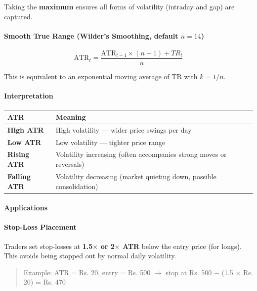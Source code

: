 \documentclass[12pt,openany]{book}
\begin{document}
Taking the \textbf{maximum} ensures all forms of volatility (intraday and gap) are captured.

\paragraph{Smooth True Range (Wilder's Smoothing, default \(n = 14\))}

\[
\text{ATR}_t = \frac{\text{ATR}_{t-1} \times (n - 1) + TR_t}{n}
\]

This is equivalent to an exponential moving average of TR with \(k = 1/n\).

\paragraph{Interpretation}

\begin{center}
\small
\renewcommand{\arraystretch}{1.2}
\begin{tabular}{|L{0.30\textwidth}|L{0.60\textwidth}|}
\hline
 \textbf{ATR} & \textbf{Meaning} \\ \hline
 \textbf{High ATR} & High volatility --- wider price swings per day \\ \hline
 \textbf{Low ATR} & Low volatility --- tighter price range \\ \hline
 \textbf{Rising ATR} & Volatility increasing (often accompanies strong moves or reversals) \\ \hline
 \textbf{Falling ATR} & Volatility decreasing (market quieting down, possible consolidation) \\ \hline
\end{tabular}
\end{center}

\paragraph{Applications}

\paragraph{Stop-Loss Placement}
Traders set stop-losses at \textbf{1.5\(\times\) or 2\(\times\) ATR} below the entry price (for longs). This avoids being stopped out by normal daily volatility.

\begin{quote}
Example: ATR = Rs. 20, entry = Rs. 500 \(\rightarrow\) stop at Rs. 500 \(-\) (1.5 \(\times\) Rs. 20) = Rs. 470

\end{quote}
\end{document}
